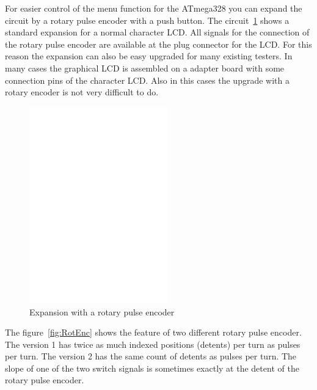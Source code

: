 For easier control of the menu function for the ATmega328 you can expand the circuit 
by a rotary pulse encoder with a push button.
The circuit~\ref{fig:RotExt} shows a standard expansion for a normal character LCD.
All signals for the connection of the rotary pulse encoder are available at the plug connector
for the LCD. For this reason the expansion can also be easy upgraded for many existing testers.
In many cases the graphical LCD is assembled on a adapter board with some connection pins
of the character LCD. Also in this cases the upgrade with a rotary encoder is not very difficult to do.

\begin{figure}[H]
\centering
\includegraphics[width=6cm]{../FIG/rotary_extension.eps}
\caption{Expansion with a rotary pulse encoder}
\label{fig:RotExt}
\end{figure}

The figure~\ref{fig:RotEnc} shows the feature of two different rotary pulse encoder.
The version 1 has twice as much indexed positions (detents) per turn as pulses per turn.
The version 2 has the same count of detents as pulses per turn.
The slope of one of the two switch signals is sometimes exactly at the detent of the 
rotary pulse encoder.

